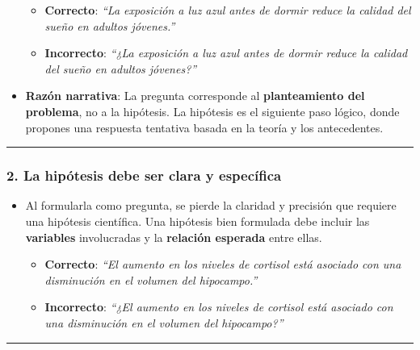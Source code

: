 \documentclass[
]{article}
\providecommand{\tightlist}{%
  \setlength{\itemsep}{0pt}\setlength{\parskip}{0pt}}\usepackage{longtable,booktabs,array}
\begin{document}
\begin{tcolorbox}
\begin{itemize}
  \begin{itemize}
  \tightlist
  \item
    \textbf{Correcto}: \emph{``La exposición a luz azul antes de dormir
    reduce la calidad del sueño en adultos jóvenes.''}\\
  \item
    \textbf{Incorrecto}: \emph{``¿La exposición a luz azul antes de
    dormir reduce la calidad del sueño en adultos jóvenes?''}
  \end{itemize}
\item
  \textbf{Razón narrativa}: La pregunta corresponde al
  \textbf{planteamiento del problema}, no a la hipótesis. La hipótesis
  es el siguiente paso lógico, donde propones una respuesta tentativa
  basada en la teoría y los antecedentes.
\end{itemize}

\begin{center}\rule{0.5\linewidth}{0.5pt}\end{center}

\subsubsection{\texorpdfstring{\textbf{2. La hipótesis debe ser clara y
específica}}{2. La hipótesis debe ser clara y específica}}\label{la-hipuxf3tesis-debe-ser-clara-y-especuxedfica}

\begin{itemize}
\tightlist
\item
  Al formularla como pregunta, se pierde la claridad y precisión que
  requiere una hipótesis científica. Una hipótesis bien formulada debe
  incluir las \textbf{variables} involucradas y la \textbf{relación
  esperada} entre ellas.

  \begin{itemize}
  \tightlist
  \item
    \textbf{Correcto}: \emph{``El aumento en los niveles de cortisol
    está asociado con una disminución en el volumen del hipocampo.''}\\
  \item
    \textbf{Incorrecto}: \emph{``¿El aumento en los niveles de cortisol
    está asociado con una disminución en el volumen del hipocampo?''}
  \end{itemize}
\end{itemize}

\begin{center}\rule{0.5\linewidth}{0.5pt}\end{center}


\end{tcolorbox}
\end{document}
